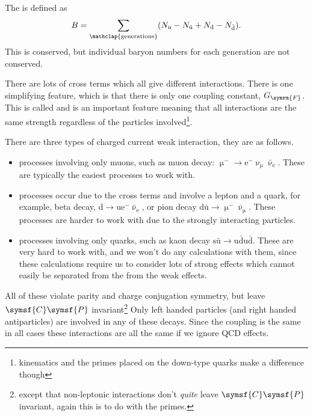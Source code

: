 \documentclass[fleqn]{NotesClass}
\newcommand{\Pparticle}[1]{\mathrm{#1}}
\newcommand{\Pu}{\ensuremath{\Pparticle{u}}}
\newcommand{\Pd}{\ensuremath{\Pparticle{d}}}
\newcommand{\Ps}{\ensuremath{\Pparticle{s}}}
\newcommand{\Pe}{\ensuremath{\Pparticle{e}^{-}}}
\newcommand{\Pmu}{\ensuremath{\upmu^{-}}}
\newcommand{\Pnumu}{\ensuremath{\upnu_{\upmu}}}
\newcommand{\APantiparticle}[1]{\bar{#1}}
\newcommand{\APu}{\ensuremath{\APantiparticle{\Pparticle{u}}}}
\newcommand{\APd}{\ensuremath{\APantiparticle{\Pparticle{d}}}}
\newcommand{\APnue}{\ensuremath{\APantiparticle{\upnu}_{\mathrm{e}}}}
\newcommand{\APnumu}{\ensuremath{\APantiparticle{\upnu}_{\text{μ}}}}
\newcommand{\chargeConjugation}{\symsf{C}}
\newcommand{\parity}{\symsf{P}}
\newcommand{\fermiConst}{G_{\symrm{F}}}
\begin{document}
    The  is defined as
    \begin{equation}
        B = \sum_{\mathclap{\text{generations}}} (N_{\Pu} - N_{\APu} + N_{\Pd} - N_{\APd}).
    \end{equation}
    This is conserved, but individual baryon numbers for each generation are not conserved.
    
    There are lots of cross terms which all give different interactions.
    There is one simplifying feature, which is that there is only one coupling constant, \(\fermiConst\).
    This is called  and is an important feature meaning that all interactions are the same strength regardless of the particles involved\footnote{kinematics and the primes placed on the down-type quarks make a difference though}.
    
    There are three types of charged current weak interaction, they are as follows.
    \begin{itemize}
        \item {} processes involving only muons, such as muon decay: \(\Pmu \to \Pe \Pnumu \APnue\).
        These are typically the easiest processes to work with.
        \item {} processes occur due to the cross terms and involve a lepton and a quark, for example, beta decay, \(\Pd \to \Pu \Pe \APnue\), or pion decay \(\Pd\APu \to \Pmu\APnumu\).
        These processes are harder to work with due to the strongly interacting particles.
        \item {} processes involving only quarks, such as kaon decay \(\Ps\APu \to \Pu\APd \Pu\APd\).
        These are very hard to work with, and we won't do any calculations with them, since these calculations require us to consider lots of strong effects which cannot easily be separated from the from the weak effects.
    \end{itemize}
    
    All of these violate parity and charge conjugation symmetry, but leave \(\chargeConjugation\parity\) invariant\footnote{except that non-leptonic interactions don't \emph{quite} leave \(\chargeConjugation\parity\) invariant, again this is to do with the primes.}
    Only left handed particles (and right handed antiparticles) are involved in any of these decays.
    Since the coupling is the same in all cases these interactions are all the same if we ignore QCD effects.
    
\end{document}
